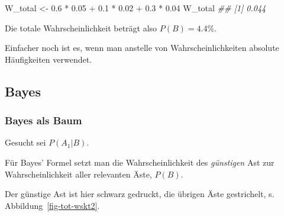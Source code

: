 \documentclass[
  a4paper,
  DIV=11]{scrreprt}
\newenvironment{Shaded}{\begin{snugshade}}{\end{snugshade}}
\newcommand{\DocumentationTok}[1]{\textcolor[rgb]{0.37,0.37,0.37}{\textit{#1}}}
\newcommand{\FloatTok}[1]{\textcolor[rgb]{0.68,0.00,0.00}{#1}}
\newcommand{\NormalTok}[1]{\textcolor[rgb]{0.00,0.23,0.31}{#1}}
\newcommand{\OtherTok}[1]{\textcolor[rgb]{0.00,0.23,0.31}{#1}}
\newcommand{\SpecialCharTok}[1]{\textcolor[rgb]{0.37,0.37,0.37}{#1}}
\theoremstyle{definition}
\theoremstyle{remark}
\begin{document}
\begin{Shaded}
\begin{Highlighting}[]
\NormalTok{W\_total }\OtherTok{\textless{}{-}} \FloatTok{0.6} \SpecialCharTok{*} \FloatTok{0.05} \SpecialCharTok{+} \FloatTok{0.1} \SpecialCharTok{*} \FloatTok{0.02} \SpecialCharTok{+} \FloatTok{0.3} \SpecialCharTok{*} \FloatTok{0.04}
\NormalTok{W\_total}
\DocumentationTok{\#\# [1] 0.044}
\end{Highlighting}
\end{Shaded}

Die totale Wahrscheinlichkeit beträgt also \(P(B) = 4.4\%\).

Einfacher noch ist es, wenn man anstelle von Wahrscheinlichkeiten
absolute Häufigkeiten verwendet.

\hypertarget{bayes}{%
\subsection{Bayes}\label{bayes}}

\hypertarget{bayes-als-baum}{%
\subsubsection{Bayes als Baum}\label{bayes-als-baum}}

Gesucht sei \(P(A_1|B)\).

Für Bayes' Formel setzt man die Wahrscheinlichkeit des \emph{günstigen}
Ast zur Wahrscheinlichkeit aller relevanten Äste, \(P(B)\).

Der günstige Ast ist hier schwarz gedruckt, die übrigen Äste
gestrichelt, s. Abbildung~\ref{fig-tot-wskt2}.
\end{document}
